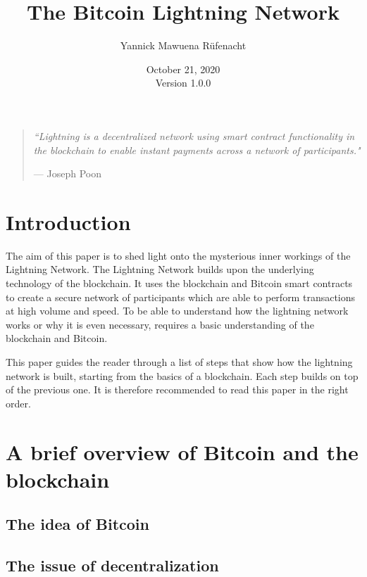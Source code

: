\documentclass[a4paper, 12pt]{report}
\begin{document}
\title{\Large{\textbf{The Bitcoin Lightning Network}}}
\author{Yannick Mawuena Rüfenacht}
\date{October 21, 2020\\Version 1.0.0}
\maketitle

\begin{quote}
\vspace*{\fill}
\textit{``Lightning is a decentralized network using smart contract functionality in the blockchain to enable instant payments across a network of participants."}
\par\raggedleft--- \textup{Joseph Poon}
\vspace*{\fill}
\end{quote}

\tableofcontents
\pagebreak

\setlength{\parskip}{1em}
\setlength{\parindent}{0em}

\chapter{Introduction}
\par The aim of this paper is to shed light onto the mysterious inner workings of the Lightning Network. The Lightning Network builds upon the underlying technology of the blockchain. It uses the blockchain and Bitcoin smart contracts to create a secure network of participants which are able to perform transactions at high volume and speed. To be able to understand how the lightning network works or why it is even necessary, requires a basic understanding of the blockchain and Bitcoin.
\par This paper guides the reader through a list of steps that show how the lightning network is built, starting from the basics of a blockchain. Each step builds on top of the previous one. It is therefore recommended to read this paper in the right order.


\chapter{A brief overview of Bitcoin and the blockchain}
\section{The idea of Bitcoin}
\section{The issue of decentralization}
\end{document}
